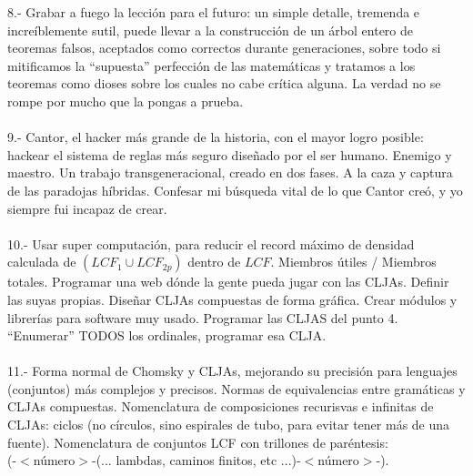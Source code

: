 8.- Grabar a fuego la lección para el futuro: un simple detalle, tremenda e increíblemente sutil, puede llevar a la construcción de un árbol entero de teoremas falsos, aceptados como correctos durante generaciones, sobre todo si mitificamos la ``supuesta'' perfección de las matemáticas y tratamos a los teoremas como dioses sobre los cuales no cabe crítica alguna. La verdad no se rompe por mucho que la pongas a prueba.\\\\
9.- Cantor, el hacker más grande de la historia, con el mayor logro posible: hackear el sistema de reglas más seguro diseñado por el ser humano. Enemigo y maestro. Un trabajo transgeneracional, creado en dos fases. A la caza y captura de las paradojas híbridas. Confesar mi búsqueda vital de lo que Cantor creó, y yo siempre fui incapaz de crear.\\\\
10.- Usar super computación, para reducir el record máximo de densidad calculada de $(LCF_{1} \cup LCF_{2p})$ dentro de $LCF$. Miembros útiles / Miembros totales. Programar una web dónde la gente pueda jugar con las CLJAs. Definir las suyas propias. Diseñar CLJAs compuestas de forma gráfica. Crear módulos y librerías para software muy usado. Programar las CLJAS del punto 4. ``Enumerar'' TODOS los ordinales, programar esa CLJA.\\\\
11.- Forma normal de Chomsky y CLJAs, mejorando su precisión para lenguajes (conjuntos) más complejos y precisos. Normas de equivalencias entre gramáticas y CLJAs compuestas. Nomenclatura de composiciones recurisvas e infinitas de CLJAs: ciclos (no círculos, sino espirales de tubo, para evitar tener más de una fuente). Nomenclatura de conjuntos LCF con trillones de paréntesis:\\
(-$<$número$>$-(... lambdas, caminos finitos, etc ...)-$<$número$>$-).




